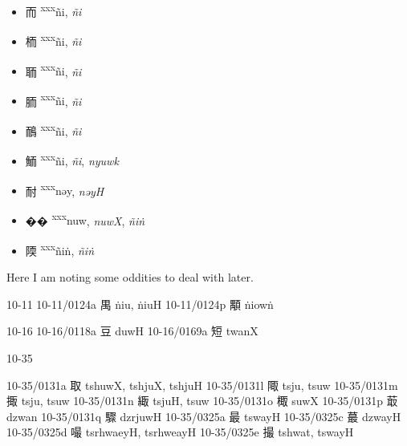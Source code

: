 \begin{itemize}

    \item {\Large{而}} %
    {\large{{\textsuperscript{xxx}ñi}}},
    \textit{ñi}                %

    \item {\Large{栭}} %
    {\large{{\textsuperscript{xxx}ñi}}},
    \textit{ñi}                %

    \item {\Large{聏}} %
    {\large{{\textsuperscript{xxx}ñi}}},
    \textit{ñi}                %

    \item {\Large{胹}} %
    {\large{{\textsuperscript{xxx}ñi}}},
    \textit{ñi}                %

    \item {\Large{鴯}} %
    {\large{{\textsuperscript{xxx}ñi}}},
    \textit{ñi}                %

    \item {\Large{鮞}} %
    {\large{{\textsuperscript{xxx}ñi}}},
    \textit{ñi}, \textit{nyuwk} %

    \item {\Large{耐}} %
    {\large{{\textsuperscript{xxx}nəy}}},
    \textit{nəyH}               %

    \item {\Large{��}} %
    {\large{{\textsuperscript{xxx}nuw}}},
    \textit{nuwX}, \textit{ñiṅ} %

    \item {\Large{陾}} %
    {\large{{\textsuperscript{xxx}ñiṅ}}},
    \textit{ñiṅ}               %

\end{itemize}

Here I am noting some oddities to deal with later. 

10-11
    10-11/0124a 禺 ṅiu, ṅiuH
    10-11/0124p 顒 ṅiowṅ

10-16
    10-16/0118a 豆 duwH
    10-16/0169a 短 twanX

10-35

    10-35/0131a 取 tshuwX, tshjuX, tshjuH
    10-35/0131l 陬 tsju, tsuw
    10-35/0131m 掫 tsju, tsuw
    10-35/0131n 緅 tsjuH, tsuw
    10-35/0131o 棷 suwX
    10-35/0131p 菆 dzwan
    10-35/0131q 驟 dzrjuwH
    10-35/0325a 最 tswayH
    10-35/0325c 蕞 dzwayH
    10-35/0325d 嘬 tsrhwaeyH, tsrhweayH
    10-35/0325e 撮 tshwat, tswayH


